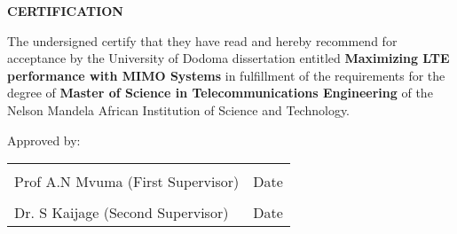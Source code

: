 \begin{center}
{\large \textbf{CERTIFICATION}} \\
\vspace{1in}
\end{center}
The undersigned certify that they have read and hereby recommend for acceptance by the University of Dodoma dissertation entitled \textbf{Maximizing LTE performance with MIMO Systems} in fulfillment of the requirements for the degree of \textbf{Master of Science in Telecommunications Engineering} of the Nelson Mandela African Institution of Science and Technology.

\vspace{1in}
\begin{center}
Approved by: 
\bigbreak
\noindent\begin{tabular}{ll}
	\makebox[2.5in]{\hrulefill} & \makebox[2.5in]{\hrulefill}\\
	Prof A.N Mvuma (First Supervisor) & Date\\[8ex]%
	\makebox[2.5in]{\hrulefill} & \makebox[2.5in]{\hrulefill}\\
	Dr. S Kaijage (Second Supervisor) & Date\\
\end{tabular}
\end{center}
\newpage